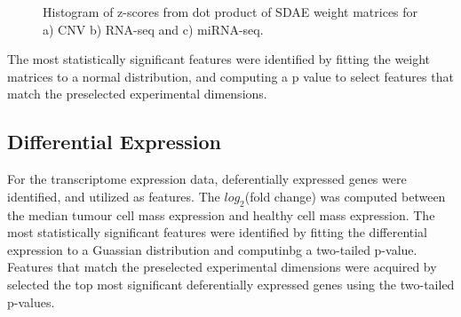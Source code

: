 \begin{figure}[h!]
\begin{subfigure}[b]{0.3\textwidth}
         \caption{}
     \end{subfigure}
        \caption{Histogram of z-scores from dot product of SDAE weight matrices for a) CNV b) RNA-seq and c) miRNA-seq.}
        \label{fig:zscoreHist}
\end{figure}

The most statistically significant features were identified by fitting the weight matrices to a normal distribution, and computing a p value to select features that match the preselected experimental dimensions.

\subsection{Differential Expression}

For the transcriptome expression data, deferentially expressed genes were identified, and utilized as features. The $log_{2}$(fold change) was computed between the median tumour cell mass expression and healthy cell mass expression. The most statistically significant features were identified by fitting the differential expression to a Guassian distribution and computinbg a two-tailed p-value. Features that match the preselected experimental dimensions were acquired by selected the top most significant deferentially expressed genes using the two-tailed p-values. 

